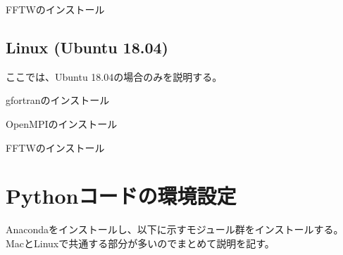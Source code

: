 \documentclass[letterpaper,10pt,dvipdfmx,report]{sphinxmanual}
\begin{document}
\begin{sphinxVerbatim}[commandchars=\\\{\}]
  
\end{sphinxVerbatim}

FFTWのインストール

\begin{sphinxVerbatim}[commandchars=\\\{\}]
  
\end{sphinxVerbatim}


\subsection{Linux (Ubuntu 18.04)}
\label{\detokenize{environment:linux-ubuntu-18-04}}
ここでは、Ubuntu 18.04の場合のみを説明する。

gfortranのインストール

\begin{sphinxVerbatim}[commandchars=\\\{\}]
   
\end{sphinxVerbatim}

OpenMPIのインストール

\begin{sphinxVerbatim}[commandchars=\\\{\}]
     
\end{sphinxVerbatim}

FFTWのインストール

\begin{sphinxVerbatim}[commandchars=\\\{\}]
   
\end{sphinxVerbatim}


\section{Pythonコードの環境設定}
\label{\detokenize{environment:python}}
Anacondaをインストールし、以下に示すモジュール群をインストールする。
MacとLinuxで共通する部分が多いのでまとめて説明を記す。
\end{document}
